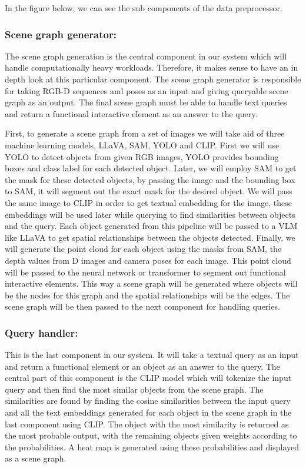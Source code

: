 In the figure below, we can see the sub components of the data preprocessor.

\subsubsection{Scene graph generator:}
The scene graph generation is the central component in our system which will handle computationally heavy workloads. Therefore, it makes sense to have an 
in depth look at this particular component. The scene graph generator is responsible for taking RGB-D sequences and poses as an input and giving queryable scene graph
as an output. The final scene graph must be able to handle text queries and return a functional interactive element as an answer to the query. 

First, to generate a scene graph from a set of images we will take aid of three machine learning models, LLaVA, SAM, YOLO and CLIP. First we will use YOLO to detect 
objects from given RGB images, YOLO provides bounding boxes and class label for each detected object. Later, we will employ SAM to get the mask for these detected 
objects, by passing the image and the bounding box to SAM, it will segment out the exact mask for the desired object. We will pass the same image to CLIP
in order to get textual embedding for the image, these embeddings will be used later while querying to find similarities between objects and the query. 
Each object generated from this pipeline will be passed to a VLM like LLaVA to get spatial relationships between the objects detected. Finally,
we will generate the point cloud for each object using the masks from SAM, the depth values from D images and camera poses for each image. This point cloud
will be passed to the neural network or transformer to segment out functional interactive elements. This way a scene graph will be generated where objects will be
the nodes for this graph and the spatial relationships will be the edges. The scene graph will be then passed to the next component for handling queries.

\subsubsection{Query handler:}
This is the last component in our system. It will take a textual query as an input and return a functional element or an object as an answer to the query. The central
part of this component is the CLIP model which will tokenize the input query and then find the most similar objects from the scene graph. The similarities are found 
by finding the cosine similarities between the input query and all the text embeddings generated for each object in the scene graph in the last component using CLIP.
The object with the most similarity is returned as the most probable output, with the remaining objects given weights according to the probabilities. A heat map is 
generated using these probabilities and displayed as a scene graph.

